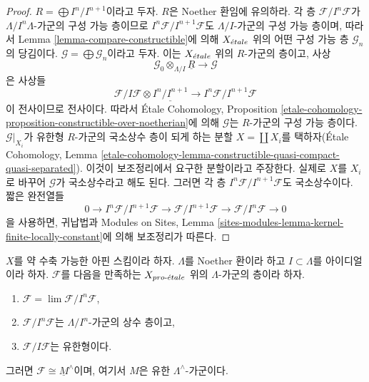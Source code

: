 \begin{proof}
$R = \bigoplus I^n/I^{n + 1}$이라고 두자. $R$은 Noether 환임에
유의하라. 각 층 $\mathcal{F}/I^n\mathcal{F}$가
$\Lambda/I^n\Lambda$-가군의 구성 가능 층이므로
$I^n\mathcal{F}/I^{n + 1}\mathcal{F}$도 $\Lambda/I$-가군의 구성 가능
층이며, 따라서 Lemma \ref{lemma-compare-constructible}에 의해
$X_{\acute{e}tale}$ 위의 어떤 구성 가능 층 $\mathcal{G}_n$의 당김이다.
$\mathcal{G} = \bigoplus \mathcal{G}_n$이라고 두자. 이는 $X_{\acute{e}tale}$
위의 $R$-가군의 층이고, 사상
$$
\mathcal{G}_0 \otimes_{\Lambda/I} \underline{R}
\longrightarrow
\mathcal{G}
$$
은 사상들
$$
\mathcal{F}/I\mathcal{F} \otimes \underline{I^n/I^{n + 1}} \to
I^n\mathcal{F}/I^{n + 1}\mathcal{F}
$$
이 전사이므로 전사이다. 따라서 \'Etale Cohomology, Proposition
\ref{etale-cohomology-proposition-constructible-over-noetherian}에 의해
$\mathcal{G}$는 $R$-가군의 구성 가능 층이다.
$\mathcal{G}|_{X_i}$가 유한형 $R$-가군의 국소상수 층이 되게 하는
분할 $X = \coprod X_i$를 택하자(\'Etale Cohomology, Lemma
\ref{etale-cohomology-lemma-constructible-quasi-compact-quasi-separated}).
이것이 보조정리에서 요구한 분할이라고 주장한다. 실제로 $X$를
$X_i$로 바꾸어 $\mathcal{G}$가 국소상수라고 해도 된다. 그러면 각
층 $I^n\mathcal{F}/I^{n + 1}\mathcal{F}$도 국소상수이다. 짧은
완전열들
$$
0 \to I^n\mathcal{F}/I^{n + 1}\mathcal{F} \to
\mathcal{F}/I^{n + 1}\mathcal{F} \to \mathcal{F}/I^n\mathcal{F} \to 0
$$
을 사용하면,
귀납법과 Modules on Sites, Lemma
\ref{sites-modules-lemma-kernel-finite-locally-constant}에 의해
보조정리가 따른다.
\end{proof}

\begin{lemma}
\label{lemma-weird}
$X$를 약 수축 가능한 아핀 스킴이라 하자. $\Lambda$를 Noether 환이라
하고 $I \subset \Lambda$를 아이디얼이라 하자. $\mathcal{F}$를 다음을
만족하는 $X_{pro\text{-}\acute{e}tale}$ 위의 $\Lambda$-가군의 층이라 하자.
\begin{enumerate}
\item $\mathcal{F} = \lim \mathcal{F}/I^n\mathcal{F}$,
\item $\mathcal{F}/I^n\mathcal{F}$는 $\Lambda/I^n$-가군의 상수 층이고,
\item $\mathcal{F}/I\mathcal{F}$는 유한형이다.
\end{enumerate}
그러면 $\mathcal{F} \cong \underline{M}^\wedge$이며, 여기서 $M$은
유한 $\Lambda^\wedge$-가군이다.
\end{lemma}

